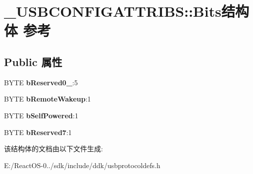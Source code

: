 \hypertarget{struct___u_s_b_c_o_n_f_i_g_a_t_t_r_i_b_s_1_1_bits}{}\section{\+\_\+\+U\+S\+B\+C\+O\+N\+F\+I\+G\+A\+T\+T\+R\+I\+BS\+:\+:Bits结构体 参考}
\label{struct___u_s_b_c_o_n_f_i_g_a_t_t_r_i_b_s_1_1_bits}
\subsection*{Public 属性}
\begin{DoxyCompactItemize}
\item 
\mbox{\label{struct___u_s_b_c_o_n_f_i_g_a_t_t_r_i_b_s_1_1_bits_ab7c980300f0939021e10224c0b2b6ac8}} 
B\+Y\+TE {\bfseries b\+Reserved0\+\_}\+:5
\item 
\mbox{\label{struct___u_s_b_c_o_n_f_i_g_a_t_t_r_i_b_s_1_1_bits_a35704c7209e1d2a7a45a554ff8466a5a}} 
B\+Y\+TE {\bfseries b\+Remote\+Wakeup}\+:1
\item 
\mbox{\label{struct___u_s_b_c_o_n_f_i_g_a_t_t_r_i_b_s_1_1_bits_aeb12294d5bdd1efdc2e270718a0e08e4}} 
B\+Y\+TE {\bfseries b\+Self\+Powered}\+:1
\item 
\mbox{\label{struct___u_s_b_c_o_n_f_i_g_a_t_t_r_i_b_s_1_1_bits_a51fd96c9d45f6f6d4b8b51a778538925}} 
B\+Y\+TE {\bfseries b\+Reserved7}\+:1
\end{DoxyCompactItemize}


该结构体的文档由以下文件生成\+:\begin{DoxyCompactItemize}
\item 
E\+:/\+React\+O\+S-\/0../sdk/include/ddk/usbprotocoldefs.\+h\end{DoxyCompactItemize}
